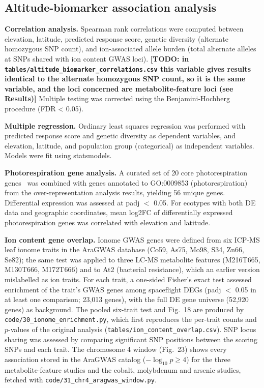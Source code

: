 \documentclass[sn-mathphys-num,Basic]{sn-jnl}
\begin{document}
\subsection{Altitude-biomarker association analysis}

\textbf{Correlation analysis.} Spearman rank correlations were computed between elevation, latitude, predicted response score, genetic diversity (alternate homozygous SNP count), and ion-associated allele burden (total alternate alleles at SNPs shared with ion content GWAS loci). \textbf{[TODO: in \texttt{tables/altitude\_biomarker\_correlations.csv} this variable gives results identical to the alternate homozygous SNP count, so it is the same variable, and the loci concerned are metabolite-feature loci (see Results)]} Multiple testing was corrected using the Benjamini-Hochberg procedure (FDR < 0.05).

\textbf{Multiple regression.} Ordinary least squares regression was performed with predicted response score and genetic diversity as dependent variables, and elevation, latitude, and population group (categorical) as independent variables. Models were fit using statsmodels.

\textbf{Photorespiration gene analysis.} A curated set of 20 core photorespiration genes~\cite{Bauwe2012} was combined with genes annotated to GO:0009853 (photorespiration) from the over-representation analysis results, yielding 56 unique genes. Differential expression was assessed at padj $<$ 0.05. For ecotypes with both DE data and geographic coordinates, mean log2FC of differentially expressed photorespiration genes was correlated with elevation and latitude.

\textbf{Ion content gene overlap.} Ionome GWAS genes were defined from six ICP-MS leaf ionome traits in the AraGWAS database (Co59, As75, Mo98, S34, Zn66, Se82); the same test was applied to three LC-MS metabolite features (M216T665, M130T666, M172T666) and to At2 (bacterial resistance), which an earlier version mislabelled as ion traits. For each trait, a one-sided Fisher's exact test assessed enrichment of the trait's GWAS genes among spaceflight DEGs (padj $<$ 0.05 in at least one comparison; 23,013 genes), with the full DE gene universe (52,920 genes) as background. The pooled six-trait test and Fig.~18 are produced by \texttt{code/30\_ionome\_enrichment.py}, which first reproduces the per-trait counts and $p$-values of the original analysis (\texttt{tables/ion\_content\_overlap.csv}). SNP locus sharing was assessed by comparing significant SNP positions between the scoring SNPs and each trait. The chromosome 4 window (Fig.~23) shows every association stored in the AraGWAS catalog ($-\log_{10} p \ge 4$) for the three metabolite-feature studies and the cobalt, molybdenum and arsenic studies, fetched with \texttt{code/31\_chr4\_aragwas\_window.py}.
\end{document}
